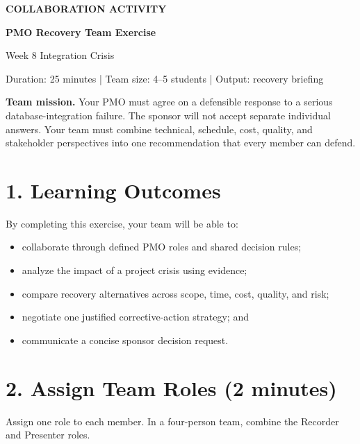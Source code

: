 \documentclass[11pt,a4paper]{article}
\begin{document}
\begin{center}
  {\small\bfseries\color{pmoPurple} COLLABORATION ACTIVITY}\par
  \vspace{2mm}
  {\Huge\bfseries\color{pmoDark} PMO Recovery Team Exercise}\par
  \vspace{2mm}
  {\Large Week 8 Integration Crisis}\par
  \vspace{3mm}
  {\small Duration: 25 minutes \quad | \quad Team size: 4--5 students \quad | \quad Output: recovery briefing}
\end{center}

\begin{missionbox}
\textbf{Team mission.} Your PMO must agree on a defensible response to a serious database-integration failure. The sponsor will not accept separate individual answers. Your team must combine technical, schedule, cost, quality, and stakeholder perspectives into one recommendation that every member can defend.
\end{missionbox}

\section{1. Learning Outcomes}

By completing this exercise, your team will be able to:

\begin{itemize}
  \item collaborate through defined PMO roles and shared decision rules;
  \item analyze the impact of a project crisis using evidence;
  \item compare recovery alternatives across scope, time, cost, quality, and risk;
  \item negotiate one justified corrective-action strategy; and
  \item communicate a concise sponsor decision request.
\end{itemize}

\section{2. Assign Team Roles (2 minutes)}

Assign one role to each member. In a four-person team, combine the Recorder and Presenter roles.
\end{document}
